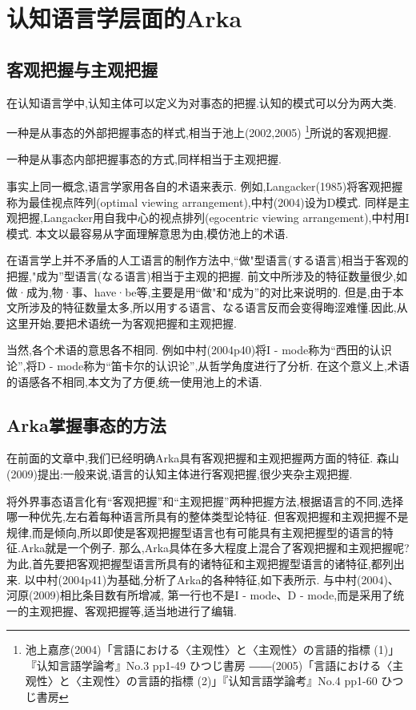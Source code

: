 \chapter[认知语言学层面的Arka]{认知语言学层面的Arka}

\section{客观把握与主观把握}
在认知语言学中,认知主体可以定义为对事态的把握.认知的模式可以分为两大类.

一种是从事态的外部把握事态的样式,相当于池上(2002,2005)
\footnote{池上嘉彦(2004)「言語における〈主观性〉と〈主观性〉の言語的指標 (1)」『认知言語学論考』No.3 pp1-49 ひつじ書房
――(2005)「言語における〈主观性〉と〈主观性〉の言語的指標 (2)」『认知言語学論考』No.4 pp1-60 ひつじ書房}所说的客观把握.

一种是从事态内部把握事态的方式,同样相当于主观把握.

事实上同一概念,语言学家用各自的术语来表示.
例如,Langacker(1985)将客观把握称为最佳视点阵列(optimal viewing arrangement),中村(2004)设为D模式.
同样是主观把握,Langacker用自我中心的视点排列(egocentric viewing arrangement),中村用I模式.
本文以最容易从字面理解意思为由,模仿池上的术语.

在语言学上并不矛盾的人工语言的制作方法中,``做"型语言(する语言)相当于客观的把握,"成为''型语言(なる语言)相当于主观的把握.
前文中所涉及的特征数量很少,如做·成为,物·事、have·be等,主要是用``做"和"成为''的对比来说明的.
但是,由于本文所涉及的特征数量太多,所以用する语言、なる语言反而会变得晦涩难懂.因此,从这里开始,要把术语统一为客观把握和主观把握.

当然,各个术语的意思各不相同.
例如中村(2004p40)将I - mode称为``西田的认识论'',将D - mode称为``笛卡尔的认识论'',从哲学角度进行了分析.
在这个意义上,术语的语感各不相同,本文为了方便,统一使用池上的术语.

\section{Arka掌握事态的方法}

在前面的文章中,我们已经明确Arka具有客观把握和主观把握两方面的特征.
森山(2009)提出:一般来说,语言的认知主体进行客观把握,很少夹杂主观把握.

将外界事态语言化有``客观把握''和``主观把握''两种把握方法,根据语言的不同,选择哪一种优先,左右着每种语言所具有的整体类型论特征.
但客观把握和主观把握不是规律,而是倾向,所以即使是客观把握型语言也有可能具有主观把握型的语言的特征.Arka就是一个例子.
那么,Arka具体在多大程度上混合了客观把握和主观把握呢?为此,首先要把客观把握型语言所具有的诸特征和主观把握型语言的诸特征,都列出来.
以中村(2004p41)为基础,分析了Arka的各种特征,如下表所示.
与中村(2004)、河原(2009)相比条目数有所增减,
第一行也不是I - mode、D - mode,而是采用了统一的主观把握、客观把握等,适当地进行了编辑.

